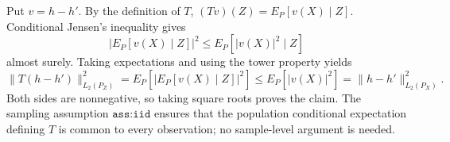 Put \(v=h-h'\). By the definition of \(T\), \((Tv)(Z)=E_P[v(X)\mid Z]\). Conditional Jensen's inequality gives
\[
 |E_P[v(X)\mid Z]|^2\le E_P[|v(X)|^2\mid Z]
\]
almost surely. Taking expectations and using the tower property yields
\[
 \|T(h-h')\|_{L_2(P_Z)}^2
 =E_P\!\left[|E_P[v(X)\mid Z]|^2\right]
 \le E_P[|v(X)|^2]
 =\|h-h'\|_{L_2(P_X)}^2.
\]
Both sides are nonnegative, so taking square roots proves the claim. The sampling assumption \(\texttt{ass:iid}\) ensures that the population conditional expectation defining \(T\) is common to every observation; no sample-level argument is needed.